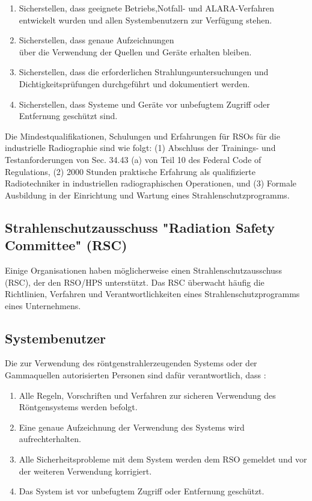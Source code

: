 {\begin{enumerate}
  \item Sicherstellen, dass geeignete Betriebs,Notfall- und ALARA-Verfahren \\entwickelt wurden und allen Systembenutzern zur Verfügung stehen.
  \item Sicherstellen, dass genaue Aufzeichnungen \\ über die Verwendung der Quellen und Geräte erhalten bleiben.
  \item Sicherstellen, dass die erforderlichen Strahlungsuntersuchungen und Dichtigkeitsprüfungen durchgeführt und dokumentiert werden.
  \item Sicherstellen, dass Systeme und Geräte vor unbefugtem Zugriff oder Entfernung geschützt sind.
\end{enumerate}
Die Mindestqualifikationen, Schulungen und Erfahrungen für RSOs für die industrielle Radiographie sind wie folgt: (1) Abschluss der Trainings- und Testanforderungen von Sec. 34.43 (a) von Teil 10 des Federal Code of Regulations, (2) 2000 Stunden praktische Erfahrung als qualifizierte Radiotechniker in industriellen radiographischen Operationen, und (3) Formale Ausbildung in der Einrichtung und Wartung eines Strahlenschutzprogramms.
\subsection{Strahlenschutzausschuss "Radiation Safety Committee" (RSC)}
Einige Organisationen haben möglicherweise einen Strahlenschutzausschuss (RSC), der den RSO/HPS unterstützt. Das RSC überwacht häufig die Richtlinien, Verfahren und Verantwortlichkeiten eines Strahlenschutzprogramms eines Unternehmens.
\subsection{Systembenutzer}
Die zur Verwendung des röntgenstrahlerzeugenden Systems oder der Gammaquellen autorisierten Personen sind dafür verantwortlich, dass :
\begin{enumerate}
\item Alle Regeln, Vorschriften und Verfahren zur sicheren Verwendung des Röntgensystems werden befolgt.
\item Eine genaue Aufzeichnung der Verwendung des Systems wird aufrechterhalten.
\item Alle Sicherheitsprobleme mit dem System werden dem RSO gemeldet und vor der weiteren Verwendung korrigiert.
\item Das System ist vor unbefugtem Zugriff oder Entfernung geschützt.
\end{enumerate}
}
